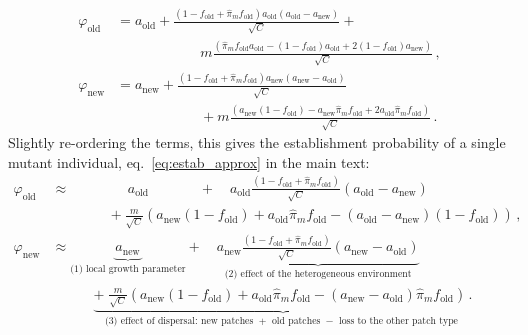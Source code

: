 \documentclass[a4paper,11pt]{scrartcl}
\begin{document}
\begin{equation}
    \begin{aligned}
        \varphi_{\text{old}} &= a_{\text{old}} + \frac{(1-f_{\text{old}}+\widehat{\pi}_m f_{\text{old}})a_{\text{old}} \left(a_{\text{old}}-a_{\text{new}}\right)}{\sqrt{C}}  + \\
        &\qquad \qquad \qquad m \frac{\left(\widehat{\pi}_m f_{\text{old}} a_{\text{old}} - (1-f_{\text{old}}) a_{\text{old}} + 2 (1-f_{\text{old}}) a_{\text{new}}  \right)}{\sqrt{C}}\, ,\\
        \varphi_{\text{new}} &= a_{\text{new}} + \frac{(1-f_{\text{old}}+\widehat{\pi}_m f_{\text{old}})a_{\text{new}} \left(a_{\text{new}} - a_{\text{old}}\right)}{\sqrt{C}} \\
        &\qquad \qquad \qquad + m \frac{\left(a_{\text{new}} (1-f_{\text{old}}) - a_{\text{new}} \widehat{\pi}_m f_{\text{old}} + 2 a_{\text{old}} \widehat{\pi}_m f_{\text{old}}  \right)}{\sqrt{C}}\, .
    \end{aligned}
\end{equation}
%
Slightly re-ordering the terms, this gives the establishment probability of a single mutant individual, eq.~\eqref{eq:estab_approx} in the main text:
\begin{equation}\label{Seq:estab_approx}
	\begin{aligned}
		\varphi_{\text{old}} &\approx \qquad \quad \; \; \; \; a_{\text{old}} \qquad \quad \;  \; +  \quad a_{\text{old}} \frac{\left(1-f_{\text{old}}+\widehat{\pi}_m f_{\text{old}}\right)}{\sqrt{C}}(a_{\text{old}}-a_{\text{new}}) \\
		& \qquad \qquad + \frac{m}{\sqrt{C}} \left(a_{\text{new}}(1-f_{\text{old}}) + a_{\text{old}}\widehat{\pi}_m f_{\text{old}} - (a_{\text{old}}-a_{\text{new}})(1-f_{\text{old}})\right) \, ,\\
		\varphi_{\text{new}} &\approx \underbrace{ a_{\text{new}}}_{\text{(1) local growth parameter}} +  \quad \underbrace{ a_{\text{new}} \frac{\left(1-f_{\text{old}}+\widehat{\pi}_m f_{\text{old}}\right)}{\sqrt{C}}(a_{\text{new}}-a_{\text{old}})}_{\text{(2) effect of the heterogeneous environment}} \\
	& \qquad \quad \underbrace{+\; \frac{m}{\sqrt{C}}\left( a_{\text{new}}(1-f_{\text{old}}) + a_{\text{old}} \widehat{\pi}_m f_{\text{old}} - (a_{\text{new}}-a_{\text{old}}) \widehat{\pi}_m f_{\text{old}} \right)\, .}_{\text{(3) effect of dispersal: new patches $+$ old patches $-$ loss to the other patch type }}
	\end{aligned}
\end{equation}
\end{document}
